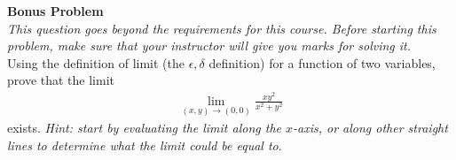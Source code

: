 \item 
\textbf{Bonus Problem}\\
\textit{This question goes beyond the requirements for this course. Before starting this problem, make sure that your instructor will give you marks for solving it.} \\
Using the definition of limit (the $\epsilon, \delta$ definition) for a function of two variables, prove that the limit
\begin{align*}
\lim_{(x,y)\rightarrow(0,0) } \frac{xy^2}{x^2+y^2}
\end{align*}
exists. \textit{Hint: start by evaluating the limit along the $x$-axis, or along other straight lines to determine what the limit could be equal to}.

\EEN